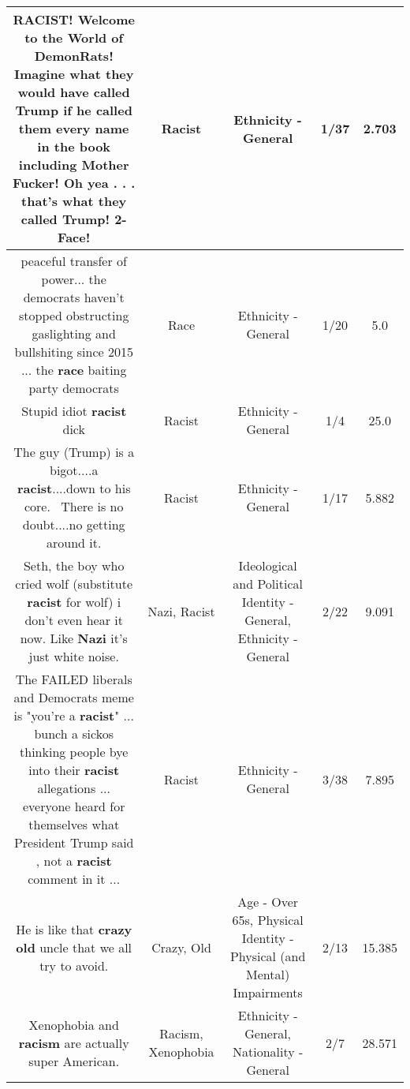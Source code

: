 \documentclass[11pt]{article}
\newlength\mylength
\begin{document}
\begin{center}
\begin{longtable}{|C{.65\mylength}|C{.30\mylength}|C{.12\mylength}|C{.12\mylength}|C{.12\mylength}|}
  \small RACIST!  Welcome to the World of DemonRats!  Imagine what they would have called Trump if he called them every name in the book including Mother Fucker!  Oh yea . . . that's what they called Trump!  2-Face!\normalsize   & Racist & Ethnicity - General & 1/37 & 2.703 \\  \hline
  \small peaceful transfer of power... the democrats haven't stopped obstructing gaslighting and bullshiting since 2015 ... the \textbf{race} baiting party democrats\normalsize   & Race & Ethnicity - General & 1/20 & 5.0 \\  \hline
  \small Stupid idiot \textbf{racist} dick\normalsize   & Racist & Ethnicity - General & 1/4 & 25.0 \\  \hline
  \small The guy (Trump) is a bigot....a \textbf{racist}....down to his core.  There is no doubt....no getting around it.\normalsize   & Racist & Ethnicity - General & 1/17 & 5.882 \\  \hline
  \small Seth,  the boy who cried wolf (substitute \textbf{racist} for wolf) i don't even hear it now. Like \textbf{Nazi} it's just white noise.\normalsize   & Nazi, Racist &  Ideological and Political Identity - General, Ethnicity - General & 2/22 & 9.091 \\  \hline
  \small The FAILED liberals and Democrats meme is "you're a \textbf{racist}" ... bunch a sickos thinking people bye into their \textbf{racist} allegations ... everyone heard for themselves what President Trump said , not a \textbf{racist} comment in it ...\normalsize   & Racist & Ethnicity - General & 3/38 & 7.895 \\  \hline
  \small He is like that \textbf{crazy} \textbf{old} uncle that we all try to avoid.\normalsize   & Crazy, Old & Age - Over 65s, Physical Identity - Physical (and Mental) Impairments & 2/13 & 15.385 \\  \hline
  \small Xenophobia and \textbf{racism} are actually super American.\normalsize   & Racism, Xenophobia & Ethnicity - General, Nationality - General & 2/7 & 28.571 \\  \hline

\end{longtable}
\end{center}
\end{document}
